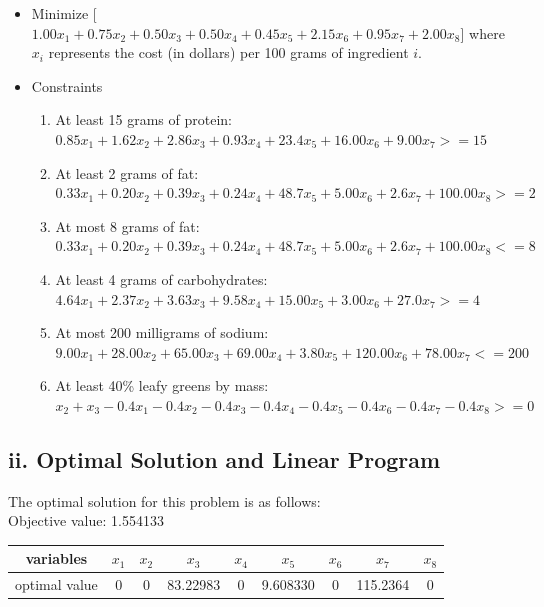 \documentclass[11pt]{scrreprt}
\begin{document}
\begin{itemize}
	\item Minimize
[$1.00x_{1}+0.75x_{2}+0.50x_{3}+0.50x_{4}+0.45x_{5}+2.15x_{6}+0.95x_{7}+2.00x_{8}$] where $x_{i}$ represents the cost (in dollars) per 100 grams of ingredient $i$.
	\item Constraints
	\begin{enumerate}
		\item At least 15 grams of protein:\\
		$0.85x_{1}+1.62x_{2}+2.86x_{3}+0.93x_{4}+23.4x_{5}+16.00x_{6}+9.00x_{7} >= 15$
		\item At least 2 grams of fat:\\
		$0.33x_{1}+0.20x_{2}+0.39x_{3}+0.24x_{4}+48.7x_{5}+5.00x_{6}+2.6x_{7}+100.00x_{8} >= 2$
		\item At most 8 grams of fat:\\
		$0.33x_{1}+0.20x_{2}+0.39x_{3}+0.24x_{4}+48.7x_{5}+5.00x_{6}+2.6x_{7}+100.00x_{8} <= 8$
		\item At least 4 grams of carbohydrates:\\
		$4.64x_{1}+2.37x_{2}+3.63x_{3}+9.58x_{4}+15.00x_{5}+3.00x_{6}+27.0x_{7} >= 4$
		\item At most 200 milligrams of sodium:\\
		$9.00x_{1}+28.00x_{2}+65.00x_{3}+69.00x_{4}+3.80x_{5}+120.00x_{6}+78.00x_{7} <= 200$
		\item At least 40\% leafy greens by mass:\\
		$x_{2}+x_{3}-0.4x_{1}-0.4x_{2}-0.4x_{3}-0.4x_{4}-0.4x_{5}-0.4x_{6}-0.4x_{7}-0.4x_{8} >= 0$
	\end{enumerate}
\end{itemize}


\subsection{ii. Optimal Solution and Linear Program}

The optimal solution for this problem is as follows:\\

Objective value: 1.554133\\

\begin{tabular}{|c|c|c|c|c|c|c|c|c|}
	\hline variables & $x_{1}$ & $x_{2}$ & $x_{3}$ & $x_{4}$ & $x_{5}$ & $x_{6}$ & $x_{7}$ & $x_{8}$ \\
	\hline optimal value & 0 & 0 & 83.22983 & 0 & 9.608330 & 0 & 115.2364 & 0 \\
	\hline
\end{tabular} \\
\end{document}
